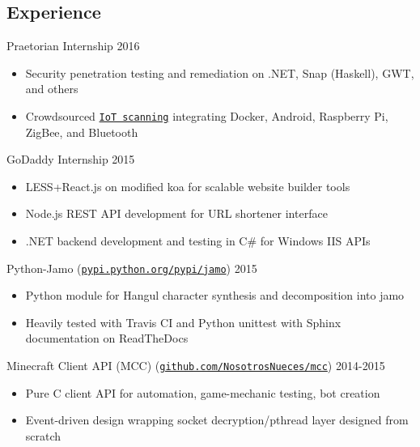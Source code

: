\documentclass[line,margin]{res}
\begin{document}
\begin{resume}
\section{Experience} 
    \vspace{12pt}
    Praetorian Internship
    \hfill  2016
        \begin{itemize} \itemsep -2pt
        \item Security penetration testing and remediation on .NET, Snap (Haskell), GWT, and others
        \item Crowdsourced \href{https://iotmap.io}{\texttt{IoT scanning}} integrating
            Docker, Android, Raspberry Pi, ZigBee, and Bluetooth
        \end{itemize}

    \vspace{-8pt}
    GoDaddy Internship
    \hfill  2015
        \begin{itemize} \itemsep -2pt
        \item LESS+React.js on modified koa for scalable website builder tools
        \item Node.js REST API development for URL shortener interface
        \item .NET backend development and testing in C\# for Windows IIS APIs
        \end{itemize}

    \vspace{-8pt}
    Python-Jamo
    (\href{https://pypi.python.org/pypi/jamo}{\texttt{pypi.python.org/pypi/jamo}})
    \hfill  2015
        \begin{itemize} \itemsep -2pt
        \item Python module for Hangul character synthesis and decomposition into jamo
        \item Heavily tested with Travis CI and Python unittest with Sphinx documentation on ReadTheDocs
        \end{itemize}

    \vspace{-8pt}
    Minecraft Client API (MCC)
    (\href{https://www.github.com/NosotrosNueces/mcc}{\texttt{github.com/NosotrosNueces/mcc}})
    \hfill  2014-2015
        \begin{itemize} \itemsep -2pt
        \item Pure C client API for automation, game-mechanic testing, bot creation
        \item Event-driven design wrapping socket decryption/pthread layer designed from scratch
        \end{itemize}


\end{resume}
\end{document}
